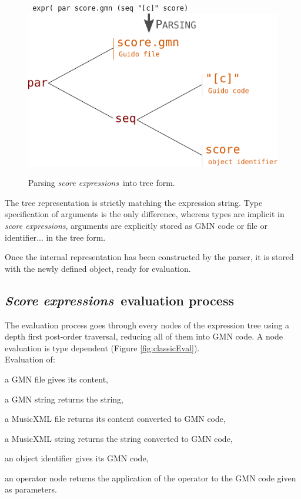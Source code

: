 \documentclass{article}
\newcommand{\OSC}[1]{{\fontsize{10pt}{10pt} \selectfont\texttt{#1}}}
\newcommand{\oper}[1]{\textcolor{figRed}{#1}}
\newcommand{\param}[1]{\textcolor{figOrange}{#1}}
\newcommand{\sExpr}{\emph{score expressions}}
\newcommand{\SExpr}{\emph{Score expressions}}
\let\olditemize\itemize
\let\oldenditemize\enditemize
\renewenvironment{itemize} 	{\olditemize \setlength{\itemsep}{1mm}}{\oldenditemize}
\begin{document}
\begin{figure}[th]
\centering
\OSC{ expr( \oper{par} \param{score.gmn}  (\oper{seq} \param{"[c]" score})}
\includegraphics[width=0.8\columnwidth]{imgs/exprParse}
\caption{Parsing \sExpr\ into tree form.
\label{fig:parsing}}
\end{figure}

The tree representation is strictly matching the expression string. Type specification of arguments is the only difference, whereas types are implicit in \sExpr, arguments are explicitly stored as GMN code or file or identifier... in the tree form. 

Once the internal representation has been constructed by the parser, it is stored with the newly defined object, ready for evaluation.

\subsection{\SExpr\ evaluation process}
The evaluation process goes through every nodes of the expression tree using a depth first post-order traversal, reducing all of them into GMN code.
A node evaluation is type dependent (Figure \ref{fig:classicEval}). \\
Evaluation of:  
\begin{itemize}
\item a GMN file gives its content,
\item a GMN string returns the string,
\item a MusicXML file returns its content converted to GMN code,
\item a MusicXML string returns the string converted to GMN code,
\item an object identifier gives its GMN code,
\item an operator node returns the application of the operator to the GMN code given as parameters.
\end{itemize}
\end{document}
